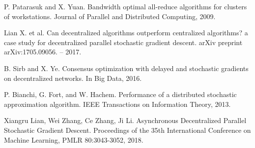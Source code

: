 \documentclass[a4paper,article,14pt]{extarticle}
\begin{document}
\begin{thebibliography}{1}
  P. Patarasuk and X. Yuan. \flqq Bandwidth optimal all-reduce algorithms for clusters of workstations\frqq. Journal of Parallel and Distributed Computing, 2009.

 Lian X. et al. \flqq Can decentralized algorithms outperform centralized algorithms? a case study for decentralized parallel stochastic gradient descent\frqq. arXiv preprint arXiv:1705.09056. – 2017.

 B. Sirb and X. Ye. \flqq Consensus optimization with delayed and stochastic gradients on decentralized networks\frqq. In Big Data, 2016.

 P. Bianchi, G. Fort, and W. Hachem. \flqq Performance of a distributed stochastic approximation algorithm\frqq. IEEE Transactions on Information Theory, 2013.

 Xiangru Lian, Wei Zhang, Ce Zhang, Ji Li. \flqq Asynchronous Decentralized Parallel Stochastic Gradient Descent\frqq. Proceedings of the 35th International Conference on Machine Learning, PMLR 80:3043-3052, 2018.

\end{thebibliography}
\end{document}

